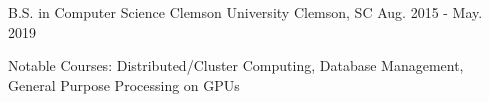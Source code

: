 

\begin{cventries}

  \cventry
    {B.S. in Computer Science} %
    {Clemson University} %
    {Clemson, SC} %
    {Aug. 2015 - May. 2019} %
    {
      \begin{cvitems} %
        \item {Notable Courses: Distributed/Cluster Computing, Database Management, General Purpose Processing on GPUs}
      \end{cvitems}
    }

\end{cventries}

